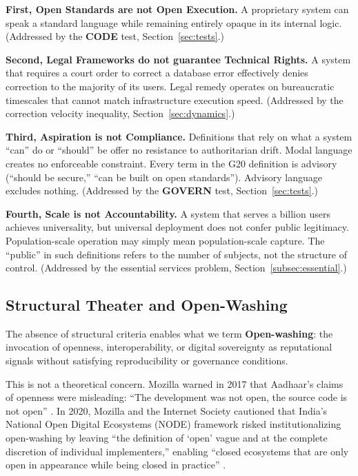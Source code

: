 \documentclass{article}
\begin{document}
\textbf{First, Open Standards are not Open Execution.} A proprietary system can speak a standard language while remaining entirely opaque in its internal logic. (Addressed by the \textbf{CODE} test, Section~\ref{sec:tests}.)

\textbf{Second, Legal Frameworks do not guarantee Technical Rights.} A system that requires a court order to correct a database error effectively denies correction to the majority of its users. Legal remedy operates on bureaucratic timescales that cannot match infrastructure execution speed. (Addressed by the correction velocity inequality, Section~\ref{sec:dynamics}.)

\textbf{Third, Aspiration is not Compliance.} Definitions that rely on what a system ``can'' do or ``should'' be offer no resistance to authoritarian drift. Modal language creates no enforceable constraint. Every term in the G20 definition is advisory (``should be secure,'' ``can be built on open standards''). Advisory language excludes nothing. (Addressed by the \textbf{GOVERN} test, Section~\ref{sec:tests}.)

\textbf{Fourth, Scale is not Accountability.} A system that serves a billion users achieves universality, but universal deployment does not confer public legitimacy. Population-scale operation may simply mean population-scale capture. The ``public'' in such definitions refers to the number of subjects, not the structure of control. (Addressed by the essential services problem, Section~\ref{subsec:essential}.)

\subsection{Structural Theater and Open-Washing}
\label{subsec:openwashing-intro}

The absence of structural criteria enables what we term \textbf{Open-washing}: the invocation of openness, interoperability, or digital sovereignty as reputational signals without satisfying reproducibility or governance conditions.

This is not a theoretical concern. Mozilla warned in 2017 that Aadhaar's claims of openness were misleading: ``The development was not open, the source code is not open'' \citep{mozilla2017}. In 2020, Mozilla and the Internet Society cautioned that India's National Open Digital Ecosystems (NODE) framework risked institutionalizing open-washing by leaving ``the definition of `open' vague and at the complete discretion of individual implementers,'' enabling ``closed ecosystems that are only open in appearance while being closed in practice'' \citep{mozilla2020}.
\end{document}
